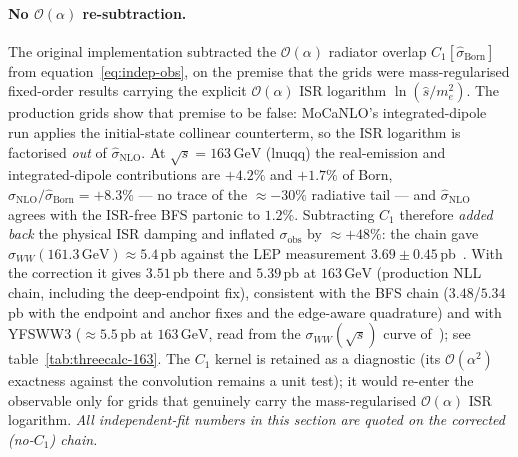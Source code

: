 \documentclass[11pt,a4paper]{article}
\newcommand{\code}[1]{\texttt{\detokenize{#1}}}
\newcommand{\sqrts}{\sqrt{s}}
\newcommand{\GeV}{\ensuremath{\,\mathrm{GeV}}}
\begin{document}
\paragraph{No $\mathcal O(\alpha)$ re-subtraction.}
The original implementation subtracted the $\mathcal O(\alpha)$ radiator overlap
$C_1[\hat\sigma_\text{Born}]$ from equation~\eqref{eq:indep-obs}, on the premise
that the \code{pdf_set=none} grids were mass-regularised fixed-order results
carrying the explicit $\mathcal O(\alpha)$ ISR logarithm $\ln(\hat s/m_e^2)$.
The production grids show that premise to be false: MoCaNLO's integrated-dipole
run applies the initial-state collinear counterterm, so the ISR logarithm is
factorised \emph{out} of $\hat\sigma_\text{NLO}$. At $\sqrts=163\GeV$ (lnuqq)
the real-emission and integrated-dipole contributions are $+4.2\%$ and $+1.7\%$
of Born, $\hat\sigma_\text{NLO}/\hat\sigma_\text{Born}=+8.3\%$ --- no trace of
the ${\approx}{-}30\%$ radiative tail --- and $\hat\sigma_\text{NLO}$ agrees with
the ISR-free BFS partonic to $1.2\%$. Subtracting $C_1$ therefore \emph{added
back} the physical ISR damping and inflated $\sigma_\text{obs}$ by
${\approx}{+}48\%$: the chain gave $\sigma_{WW}(161.3\GeV)\approx5.4$\,pb against
the LEP measurement $3.69\pm0.45$\,pb~\cite{LEP2EW}. With the correction it
gives $3.51$\,pb there and $5.39$\,pb at $163\GeV$ (production NLL chain,
including the deep-endpoint fix), consistent with the BFS
chain ($3.48$/$5.34$\,pb with the endpoint and anchor fixes and the edge-aware
quadrature) and with YFSWW3 (${\approx}5.5$\,pb at $163\GeV$, read
from the $\sigma_{WW}(\sqrts)$ curve of~\cite{Azzurri2021}); see
table~\ref{tab:threecalc-163}. The $C_1$ kernel is retained as a diagnostic
(its $\mathcal O(\alpha^2)$ exactness against the convolution remains a unit
test); it would re-enter the observable only for grids that genuinely carry the
mass-regularised $\mathcal O(\alpha)$ ISR logarithm. \emph{All independent-fit
numbers in this section are quoted on the corrected (no-$C_1$) chain.}
\end{document}
